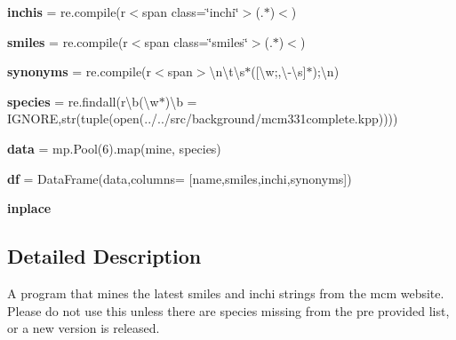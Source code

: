 \begin{DoxyCompactItemize}
\item 
\mbox{\label{namespacemineSmiles_a4c044104897aa035af11accaf6841720}} 
{\bfseries inchis} = re.\+compile(r\textquotesingle{}$<$span class=\char`\"{}inchi\char`\"{}$>$(.$\ast$)$<$\textquotesingle{})
\item 
\mbox{\label{namespacemineSmiles_ad3b6c2fccb50363dbbc8d6e14829d86e}} 
{\bfseries smiles} = re.\+compile(r\textquotesingle{}$<$span class=\char`\"{}smiles\char`\"{}$>$(.$\ast$)$<$\textquotesingle{})
\item 
\mbox{\label{namespacemineSmiles_aeebff49478938a36f8ba83978fbb3f1d}} 
{\bfseries synonyms} = re.\+compile(r\textquotesingle{}$<$span$>$\textbackslash{}n\textbackslash{}t\textbackslash{}s$\ast$(\mbox{[}\textbackslash{}w;,\textbackslash{}-\/\textbackslash{}s\mbox{]}$\ast$);\textbackslash{}n\textquotesingle{})
\item 
\mbox{\label{namespacemineSmiles_abefd382c189cd320dc537d63ac0dd282}} 
{\bfseries species} = re.\+findall(r\textquotesingle{}\textbackslash{}b(\textbackslash{}w$\ast$)\textbackslash{}b = I\+G\+N\+O\+RE\textquotesingle{},str(tuple(open(\textquotesingle{}../../src/background/mcm331complete.\+kpp\textquotesingle{}))))
\item 
\mbox{\label{namespacemineSmiles_aa9ac153b560eaa5012e0598f1233226c}} 
{\bfseries data} = mp.\+Pool(6).map(mine, species)
\item 
\mbox{\label{namespacemineSmiles_a38020d5d8da931fc86d3cfb3813fff0f}} 
{\bfseries df} = Data\+Frame(data,columns= \mbox{[}\textquotesingle{}name\textquotesingle{},\textquotesingle{}smiles\textquotesingle{},\textquotesingle{}inchi\textquotesingle{},\textquotesingle{}synonyms\textquotesingle{}\mbox{]})
\item 
\mbox{\label{namespacemineSmiles_a63c0dcfac527885f51fc39d82302ad51}} 
{\bfseries inplace}
\end{DoxyCompactItemize}


\subsection{Detailed Description}
\begin{DoxyVerb}A program that mines the latest smiles and inchi strings from the mcm website. 
Please do not use this unless there are species missing from the pre provided list, or a new version is released. \end{DoxyVerb}
 